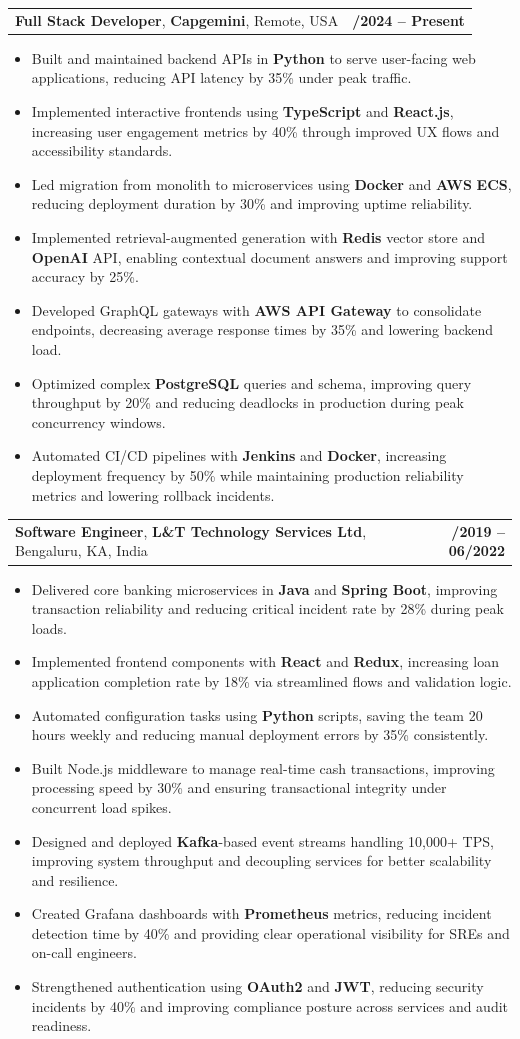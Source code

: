 \documentclass[letterpaper,11pt]{article}
\makeatletter
\newcommand{\resumeItem}[1]{
  \item\footnotesize{
    {#1 \vspace{-2pt}}
  }
}
\newcommand{\resumeSubheading}[4]{
  \vspace{-2pt}\item
    \begin{tabular*}{1.0\textwidth}[t]{l@{\extracolsep{\fill}}r}
      \textbf{\fontsize{10pt}{14pt}\selectfont #3}, \textbf{\fontsize{10pt}{14pt}\selectfont #1}, \fontsize{10pt}{14pt}\selectfont #4 & \textbf{\fontsize{10pt}{14pt}\selectfont #2} \\
    \end{tabular*}\vspace{-7pt}
}
\newcommand{\resumeItemListStart}{\begin{itemize}[leftmargin=*]}
\newcommand{\resumeItemListEnd}{\end{itemize}\vspace{-5pt}}
\makeatother
\begin{document}
    \resumeSubheading
        {Capgemini}{01/2024 -- Present}
        {Full Stack Developer}{Remote, USA}
      \resumeItemListStart
        \resumeItem{Built and maintained backend APIs in \textbf{Python} to serve user-facing web applications, reducing API latency by 35\% under peak traffic.}
        \resumeItem{Implemented interactive frontends using \textbf{TypeScript} and \textbf{React.js}, increasing user engagement metrics by 40\% through improved UX flows and accessibility standards.}
        \resumeItem{Led migration from monolith to microservices using \textbf{Docker} and \textbf{AWS} \textbf{ECS}, reducing deployment duration by 30\% and improving uptime reliability.}
        \resumeItem{Implemented retrieval-augmented generation with \textbf{Redis} vector store and \textbf{OpenAI} API, enabling contextual document answers and improving support accuracy by 25\%.}
        \resumeItem{Developed GraphQL gateways with \textbf{AWS API Gateway} to consolidate endpoints, decreasing average response times by 35\% and lowering backend load.}
        \resumeItem{Optimized complex \textbf{PostgreSQL} queries and schema, improving query throughput by 20\% and reducing deadlocks in production during peak concurrency windows.}
        \resumeItem{Automated CI/CD pipelines with \textbf{Jenkins} and \textbf{Docker}, increasing deployment frequency by 50\% while maintaining production reliability metrics and lowering rollback incidents.}
      \resumeItemListEnd

    \resumeSubheading
        {L\&T Technology Services Ltd}{08/2019 -- 06/2022}
        {Software Engineer}{Bengaluru, KA, India}
      \resumeItemListStart
        \resumeItem{Delivered core banking microservices in \textbf{Java} and \textbf{Spring Boot}, improving transaction reliability and reducing critical incident rate by 28\% during peak loads.}
        \resumeItem{Implemented frontend components with \textbf{React} and \textbf{Redux}, increasing loan application completion rate by 18\% via streamlined flows and validation logic.}
        \resumeItem{Automated configuration tasks using \textbf{Python} scripts, saving the team 20 hours weekly and reducing manual deployment errors by 35\% consistently.}
        \resumeItem{Built Node.js middleware to manage real-time cash transactions, improving processing speed by 30\% and ensuring transactional integrity under concurrent load spikes.}
        \resumeItem{Designed and deployed \textbf{Kafka}-based event streams handling 10,000+ TPS, improving system throughput and decoupling services for better scalability and resilience.}
        \resumeItem{Created Grafana dashboards with \textbf{Prometheus} metrics, reducing incident detection time by 40\% and providing clear operational visibility for SREs and on-call engineers.}
        \resumeItem{Strengthened authentication using \textbf{OAuth2} and \textbf{JWT}, reducing security incidents by 40\% and improving compliance posture across services and audit readiness.}
      \resumeItemListEnd
\end{document}
